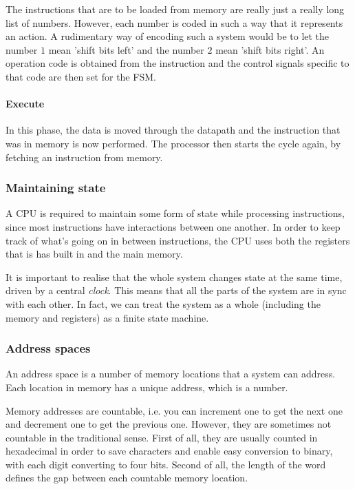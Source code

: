 \documentclass{article}
\begin{document}
The instructions that are to be loaded from memory are really just a really long
list of numbers. However, each number is coded in such a way that it represents
an action. A rudimentary way of encoding such a system would be to let the
number $1$ mean 'shift bits left' and the number $2$ mean 'shift bits right'. An
operation code is obtained from the instruction and the control signals specific
to that code are then set for the FSM.

\paragraph{Execute}\mbox{}


In this phase, the data is moved through the datapath and the instruction that
was in memory is now performed. The processor then starts the cycle again, by
fetching an instruction from memory.

\subsubsection{Maintaining state}

A CPU is required to maintain some form of state while processing instructions,
since most instructions have interactions between one another. In order to keep
track of what's going on in between instructions, the CPU uses both the registers
that is has built in and the main memory.

It is important to realise that the whole system changes state at the same time,
driven by a central {\it clock}. This means that all the parts of the system are
in sync with each other. In fact, we can treat the system as a whole (including
the memory and registers) as a finite state machine.

\subsubsection{Address spaces}

An address space is a number of memory locations that a system can address. Each
location in memory has a unique address, which is a number.

Memory addresses are countable, i.e. you can increment one to get the next one
and decrement one to get the previous one. However, they are sometimes not
countable in the traditional sense. First of all, they are usually counted in
hexadecimal in order to save characters and enable easy conversion to binary,
with each digit converting to four bits. Second of all, the length of the word
defines the gap between each countable memory location.
\end{document}
